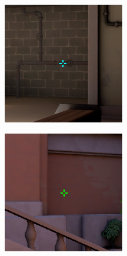 \documentclass[11pt,manuscript,screen,review]{acmart} %
\begin{document}
\begin{figure}[h]
    \centering
    \begin{subfigure}{0.3\linewidth}
        \includegraphics[width=\linewidth]{img/tenz-cyan.png}
    \end{subfigure}
    \begin{subfigure}{0.3\linewidth}
        \includegraphics[width=\linewidth,]{img/tenz-green.png}

\end{subfigure}
\end{figure}
\end{document}
